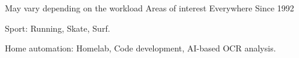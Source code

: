 

\begin{cventries}

%
    
  \cventry
    {May vary depending on the workload} %
    {Areas of interest} %
    {Everywhere} %
    {Since 1992} %
    {
      \begin{cvitems} %
        \item {Sport: Running, Skate, Surf.}
        \item {Home automation: Homelab, Code development, AI-based OCR analysis.}
      \end{cvitems}
    }

\end{cventries}
